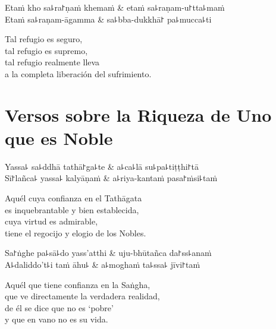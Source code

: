\begin{twochants}
  Etaṁ kho sa꜕ra꜓ṇaṁ khemaṁ & etaṁ sa꜕raṇam-u꜓tta꜕maṁ \\
  Etaṁ sa꜕raṇam-āgamma & sa꜕bba-dukkhā꜓ pa꜕mucca꜕ti \\
\end{twochants}

\begin{english}
  Tal refugio es seguro,\\
  tal refugio es supremo,\\
  tal refugio realmente lleva\\
  a la completa liberación del sufrimiento.
\end{english}

\chapter{Versos sobre la Riqueza de Uno que es Noble}


\begin{leader}
\end{leader}

\begin{twochants}
  Yassa꜕ sa꜕ddhā tathā꜓ga꜕te & a꜕ca꜕lā su꜕pa꜕tiṭṭhi꜓tā \\
  Sī꜓lañca꜕ yassa꜕ kalyāṇaṁ & a꜕riya-kantaṁ pasa꜓ṁsi꜕taṁ \\
\end{twochants}

\begin{english}
  Aquél cuya confianza en el Tathāgata\\
  es inquebrantable y bien establecida,\\
  cuya virtud es admirable,\\
  tiene el regocijo y elogio de los Nobles.
\end{english}

\begin{twochants}
  Sa꜓ṅghe pa꜕sā꜕do yass'atthi & uju-bhūtañca da꜓ss꜕anaṁ \\
  A꜕daliddo't꜕i taṁ āhu꜕ & a꜕moghaṁ ta꜕ssa꜕ jīvi꜓taṁ \\
\end{twochants}

\begin{english}
  Aquél que tiene confianza en la Saṅgha,\\
  que ve directamente la verdadera realidad,\\
  de él se dice que no es `pobre'\\
  y que en vano no es su vida.
\end{english}

